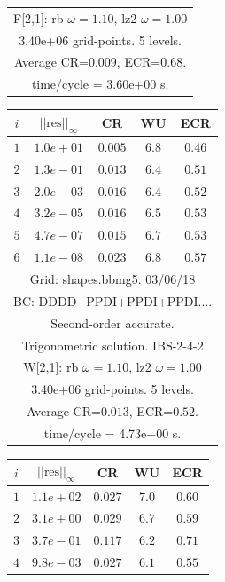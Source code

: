 \begin{table}[hbt]
\begin{center}
{\begin{tabular}{|c|c|c|c|c|}
\multicolumn{5}{|c|}{F[2,1]: rb $\omega=1.10$, lz2 $\omega=1.00$}  \\
\multicolumn{5}{|c|}{3.40e+06 grid-points. 5 levels.}  \\
\multicolumn{5}{|c|}{Average CR=$0.009$, ECR=$0.68$.}  \\
\multicolumn{5}{|c|}{time/cycle = 3.60e+00 s.}  \\
\hline 
\end{tabular}
\begin{tabular}{|c|c|c|c|c|} \hline 
 $i$   & $\vert\vert\mbox{res}\vert\vert_\infty$  &  CR     &  WU    & ECR  \\   \hline 
 $ 1$  & $ 1.0e+01$ & $0.005$ & $ 6.8$ & $0.46$ \\ 
 $ 2$  & $ 1.3e-01$ & $0.013$ & $ 6.4$ & $0.51$ \\ 
 $ 3$  & $ 2.0e-03$ & $0.016$ & $ 6.4$ & $0.52$ \\ 
 $ 4$  & $ 3.2e-05$ & $0.016$ & $ 6.5$ & $0.53$ \\ 
 $ 5$  & $ 4.7e-07$ & $0.015$ & $ 6.7$ & $0.53$ \\ 
 $ 6$  & $ 1.1e-08$ & $0.023$ & $ 6.8$ & $0.57$ \\ 
\hline 
\multicolumn{5}{|c|}{Grid: shapes.bbmg5. 03/06/18}  \\
\multicolumn{5}{|c|}{BC: DDDD+PPDI+PPDI+PPDI....}  \\
\multicolumn{5}{|c|}{Second-order accurate.}  \\
\multicolumn{5}{|c|}{Trigonometric solution. IBS-2-4-2}  \\
\multicolumn{5}{|c|}{W[2,1]: rb $\omega=1.10$, lz2 $\omega=1.00$}  \\
\multicolumn{5}{|c|}{3.40e+06 grid-points. 5 levels.}  \\
\multicolumn{5}{|c|}{Average CR=$0.013$, ECR=$0.52$.}  \\
\multicolumn{5}{|c|}{time/cycle = 4.73e+00 s.}  \\
\hline 
\end{tabular}
\begin{tabular}{|c|c|c|c|c|} \hline 
 $i$   & $\vert\vert\mbox{res}\vert\vert_\infty$  &  CR     &  WU    & ECR  \\   \hline 
 $ 1$  & $ 1.1e+02$ & $0.027$ & $ 7.0$ & $0.60$ \\ 
 $ 2$  & $ 3.1e+00$ & $0.029$ & $ 6.7$ & $0.59$ \\ 
 $ 3$  & $ 3.7e-01$ & $0.117$ & $ 6.2$ & $0.71$ \\ 
 $ 4$  & $ 9.8e-03$ & $0.027$ & $ 6.1$ & $0.55$ \\ 

\end{tabular}}
\end{center}
\end{table}
